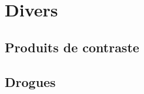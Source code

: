 \section{Divers}
  
\subsection{Produits de contraste}

\begin{boiteCodeTex}{}
  \chemfig{!\ionChelate}
  \chemfig{!\chelateAlcool}
\end{boiteCodeTex}

\subsection{Drogues}

\begin{boiteCodeTex}{}
  \chemfig{!\THC} \qq{}
  \chemfig{!\cocaineHaw}
\end{boiteCodeTex}